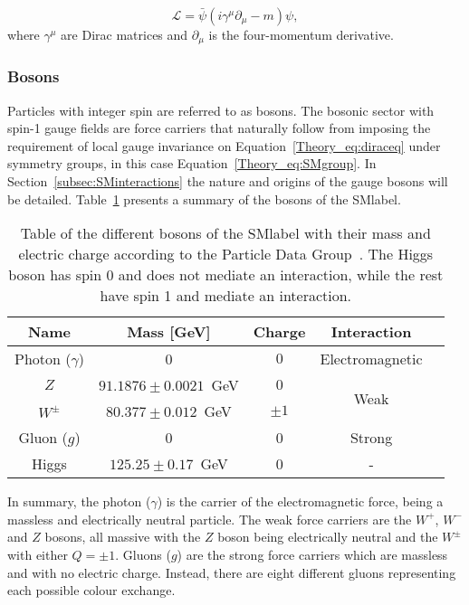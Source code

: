 \begin{equation}
\label{Theory_eq:diraceq}
    \mathcal{L} = \bar{\psi}(i\gamma^\mu\partial_\mu-m)\psi,
\end{equation}
where $\gamma^\mu$ are Dirac matrices and $\partial_\mu$ is the four-momentum derivative.

\subsubsection{Bosons}

Particles with integer spin are referred to as bosons. The bosonic sector with spin-1 gauge fields are force carriers that naturally follow from imposing the requirement of local gauge invariance on Equation~\ref{Theory_eq:diraceq} under symmetry groups, in this case Equation~\ref{Theory_eq:SMgroup}. In Section~\ref{subsec:SMinteractions} the nature and origins of the gauge bosons will be detailed. Table~\ref{tabSM:bosonscontent} presents a summary of the bosons of the \acrshort{SMlabel}.\\

\begin{table}[htbp]
    \begin{tabular}{ccccc}
    \toprule\toprule
    Name                  & Mass [GeV] & Charge & Interaction \\ \midrule
    Photon ($\gamma$)     &  0                             &  $0$ & Electromagnetic\\
    $Z$                   &  $91.1876 \pm 0.0021$~GeV      &  $0$ & \multirow{2}{*}{Weak} \\
    $W^\pm$               &  $80.377\pm 0.012$~GeV         &  $\pm 1$ & \\
    Gluon ($g$)           &  0                             &  0 & Strong \\
    Higgs                 &  $125.25\pm0.17$~GeV           &  0      & - \\
    \bottomrule\bottomrule
    \end{tabular}
    \caption{Table of the different bosons of the \acrshort{SMlabel} with their mass and electric charge according to the Particle Data Group~\cite{pdg}. The Higgs boson has spin 0 and does not mediate an interaction, while the rest have spin 1 and mediate an interaction.}
    \label{tabSM:bosonscontent}
    \end{table}

In summary, the photon ($\gamma$) is the carrier of the electromagnetic force, being a massless and electrically neutral particle.
The weak force carriers are the $W^+$, $W^-$ and $Z$ bosons, all massive with the $Z$ boson being electrically neutral and the $W^\pm$ with either $Q=\pm1$. Gluons ($g$) are the strong force carriers which are massless and with no electric charge. Instead, there are eight different gluons representing each possible colour exchange. 

